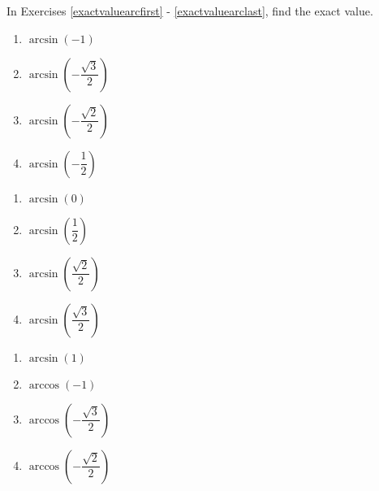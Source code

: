 In Exercises \ref{exactvaluearcfirst} - \ref{exactvaluearclast}, find the exact value.

\begin{multicols}{4} 

\begin{enumerate}

\item $\arcsin \left( -1 \right)$  \label{exactvaluearcfirst}
\item $\arcsin \left( -\dfrac{\sqrt{3}}{2} \right)$
\item $\arcsin \left( -\dfrac{\sqrt{2}}{2} \right)$
\item $\arcsin \left( -\dfrac{1}{2} \right)$ 

\setcounter{HW}{\value{enumi}}

\end{enumerate}

\end{multicols}

\begin{multicols}{4}

\begin{enumerate}

\setcounter{enumi}{\value{HW}}

\item $\arcsin \left( 0 \right)$ 
\item $\arcsin \left( \dfrac{1}{2} \right)$ 
\item $\arcsin \left( \dfrac{\sqrt{2}}{2} \right)$
\item $\arcsin \left( \dfrac{\sqrt{3}}{2} \right)$

\setcounter{HW}{\value{enumi}}

\end{enumerate}

\end{multicols}

\begin{multicols}{4}

\begin{enumerate}

\setcounter{enumi}{\value{HW}}

\item $\arcsin \left( 1 \right)$ 
\item $\arccos \left( -1 \right)$ 
\item $\arccos \left( -\dfrac{\sqrt{3}}{2} \right)$
\item $\arccos \left( -\dfrac{\sqrt{2}}{2} \right)$

\setcounter{HW}{\value{enumi}}

\end{enumerate}

\end{multicols}

